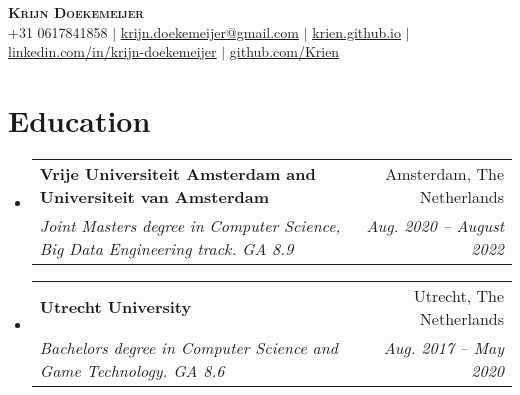 \documentclass[letterpaper,11pt]{article}
\makeatletter
\newcommand{\resumeSubheading}[4]{
  \vspace{-2pt}\item
    \begin{tabular*}{0.97\textwidth}[t]{l@{\extracolsep{\fill}}r}
      \textbf{#1} & #2 \\
      \textit{\small#3} & \textit{\small #4} \\
    \end{tabular*}\vspace{-7pt}
}
\newcommand{\resumeSubHeadingListStart}{\begin{itemize}[leftmargin=0.15in, label={}]}
\newcommand{\resumeSubHeadingListEnd}{\end{itemize}}
\makeatother
\begin{document}

\begin{center}
    \textbf{\Huge \scshape Krijn Doekemeijer} \\ \vspace{1pt}
    \small +31 0617841858 $|$ \href{mailto:krijn.doekemeijer@gmail.com}{\underline{krijn.doekemeijer@gmail.com}} $|$
    \href{https://krien.github.io/}{\underline{krien.github.io}} $|$
    \href{https://linkedin.com/in/krijn-doekemeijer-9692801aa}{\underline{linkedin.com/in/krijn-doekemeijer}} $|$
    \href{https://github.com/Krien}{\underline{github.com/Krien}}
\end{center}


\section{Education}
  \resumeSubHeadingListStart
     \resumeSubheading
      {Vrije Universiteit Amsterdam and Universiteit van Amsterdam}{Amsterdam, The Netherlands}
      {Joint Masters degree in Computer Science, Big Data Engineering track. GA 8.9}{Aug. 2020 -- August 2022}
    \resumeSubheading
      {Utrecht University}{Utrecht, The Netherlands}
      {Bachelors degree in Computer Science and Game Technology. GA 8.6 }{Aug. 2017 -- May 2020}
  \resumeSubHeadingListEnd
\end{document}
